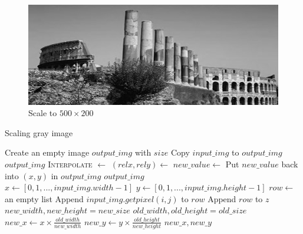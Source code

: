 \documentclass{article}
\begin{document}
\begin{figure}[H]
\centering
\includegraphics[width=375pt]{../result/scale-500-200.png}
\caption{Scale to $500 \times 200$}
\label{scale500}
\end{figure}

\begin{algorithm}[h]
\centering
\caption{Scaling gray image}
\label{alg:scale}
  \begin{algorithmic}[1]
      \State Create an empty image $output\_img$ with $size$
        \State Copy $input\_img$ to $output\_img$
        \State \Return $output\_img$
	  \EndIf
      \State \textsc{Interpolate} $\gets$ 
      	\State $(relx, rely) \gets$ 
      	\State $new\_value \gets$ 
      	\State Put $new\_value$ back into $(x, y)$ in $output\_img$
      \EndFor
      \State \Return $output\_img$
    \EndFunction
    \\
      \State $x \gets [0, 1, ..., input\_img.width - 1]$
      \State $y \gets [0, 1, ..., input\_img.height - 1]$
      	  \State $row \gets$ an empty list
      	  \State Append $input\_img.getpixel(i, j)$ to $row$
      	\EndFor
      	\State Append $row$ to $z$
      \EndFor
      \State \Return {}
    \EndFunction
    \\
      \State $new\_width, new\_height = new\_size$
      \State $old\_width, old\_height = old\_size$
      \State $new\_x \gets x \times \frac{old\_width}{new\_width}$ 
      \State $new\_y \gets y \times \frac{old\_height}{new\_height}$ 
      \State \Return $new\_x, new\_y$
    \EndFunction
  \end{algorithmic}
\end{algorithm}
\end{document}
